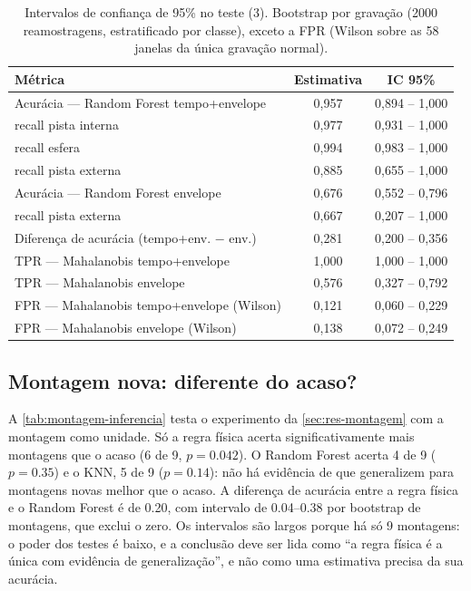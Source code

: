 \begin{table}[htb]
  \centering
  \caption{Intervalos de confiança de 95\% no teste (\SI{3}{\hp}). Bootstrap por
  gravação (2000 reamostragens, estratificado por classe), exceto a FPR (Wilson
  sobre as 58 janelas da única gravação normal).}
  \label{tab:ic}
  \footnotesize
  \begin{tabular}{lcc}
    \toprule
    \textbf{Métrica} & \textbf{Estimativa} & \textbf{IC 95\%} \\
    \midrule
    Acurácia --- Random Forest tempo+envelope   & 0,957 & 0,894 -- 1,000 \\
    \quad recall pista interna                  & 0,977 & 0,931 -- 1,000 \\
    \quad recall esfera                         & 0,994 & 0,983 -- 1,000 \\
    \quad recall pista externa                  & 0,885 & 0,655 -- 1,000 \\
    Acurácia --- Random Forest envelope         & 0,676 & 0,552 -- 0,796 \\
    \quad recall pista externa                  & 0,667 & 0,207 -- 1,000 \\
    Diferença de acurácia (tempo+env. $-$ env.) & 0,281 & 0,200 -- 0,356 \\
    \midrule
    TPR --- Mahalanobis tempo+envelope          & 1,000 & 1,000 -- 1,000 \\
    TPR --- Mahalanobis envelope                & 0,576 & 0,327 -- 0,792 \\
    FPR --- Mahalanobis tempo+envelope (Wilson) & 0,121 & 0,060 -- 0,229 \\
    FPR --- Mahalanobis envelope (Wilson)       & 0,138 & 0,072 -- 0,249 \\
    \bottomrule
  \end{tabular}
\end{table}

\subsection{Montagem nova: diferente do acaso?}
\label{sec:res-acaso}

A \autoref{tab:montagem-inferencia}
testa o experimento da \autoref{sec:res-montagem} com a montagem como unidade.
Só a regra física acerta significativamente mais montagens que o acaso
(6 de 9, $p = \num{0.042}$). O Random Forest acerta 4 de 9 ($p = \num{0.35}$) e
o KNN, 5 de 9 ($p = \num{0.14}$): não há evidência de que generalizem para
montagens novas melhor que o acaso. A diferença de acurácia entre a regra
física e o Random Forest é de \num{0.20}, com intervalo de \numrange{0.04}{0.38}
por bootstrap de montagens, que exclui o zero. Os intervalos são largos porque há
só 9 montagens: o poder dos testes é baixo, e a conclusão deve ser lida como
``a regra física é a única com evidência de generalização'', e não como uma
estimativa precisa da sua acurácia.

